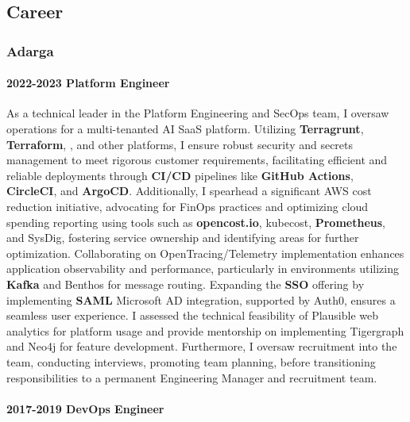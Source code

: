 \documentclass[
]{article}
\begin{document}
\hypertarget{material-briefcase-career}{%
\subsection{\texorpdfstring{\faBriefcase
Career}{ Career}}\label{material-briefcase-career}}

\hypertarget{material-office-building-adarga}{%
\subsubsection{\texorpdfstring{\faBuilding
Adarga}{ Adarga}}\label{material-office-building-adarga}}

\hypertarget{platform-engineer}{%
\paragraph{2022-2023 Platform Engineer}\label{platform-engineer}}

As a technical leader in the Platform Engineering and SecOps team, I
oversaw operations for a multi-tenanted AI SaaS platform. Utilizing
\textbf{Terragrunt}, \textbf{Terraform}, \faAws , and other platforms, I
ensure robust security and secrets management to meet rigorous customer
requirements, facilitating efficient and reliable deployments through
\textbf{CI/CD} pipelines like \faGithub \textbf{GitHub Actions},
\textbf{CircleCI}, and \textbf{ArgoCD}. Additionally, I spearhead a
significant AWS cost reduction initiative, advocating for FinOps
practices and optimizing cloud spending reporting using tools such as
\textbf{opencost.io}, kubecost, \textbf{Prometheus}, and SysDig,
fostering service ownership and identifying areas for further
optimization. Collaborating on OpenTracing/Telemetry implementation
enhances application observability and performance, particularly in
environments utilizing \textbf{Kafka} and Benthos for message routing.
Expanding the \textbf{SSO} offering by implementing \textbf{SAML}
Microsoft AD integration, supported by Auth0, ensures a seamless user
experience. I assessed the technical feasibility of Plausible web
analytics for platform usage and provide mentorship on implementing
Tigergraph and Neo4j for feature development. Furthermore, I oversaw
recruitment into the team, conducting interviews, promoting team
planning, before transitioning responsibilities to a permanent
Engineering Manager and recruitment team.

\hypertarget{devops-engineer}{%
\paragraph{2017-2019 DevOps Engineer}\label{devops-engineer}}
\end{document}
